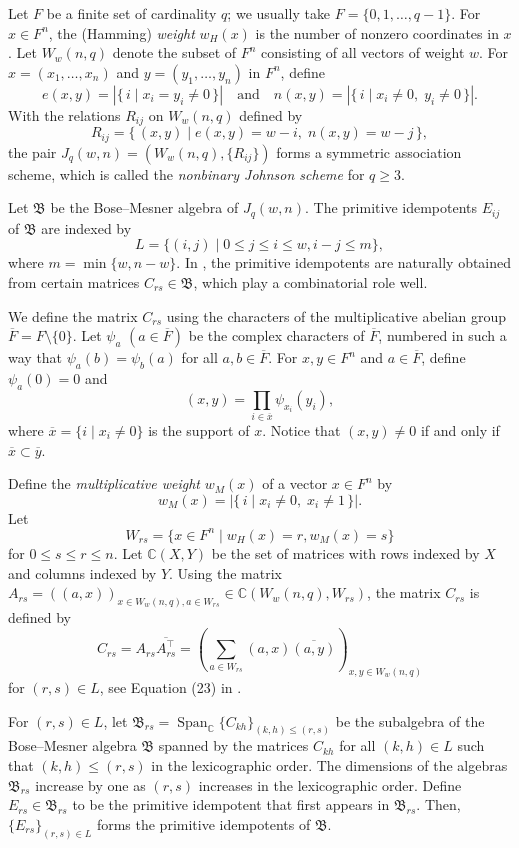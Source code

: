 \documentclass[a4paper, 11pt]{article}
\theoremstyle{definition}
\begin{document}
Let $F$ be a finite set of cardinality $q$; we usually take $F = \{0,1,\ldots,q-1\}$. 
For $x \in F^n$, the (Hamming) \emph{weight} $w_H(x)$ is the number of nonzero coordinates in $x$. 
Let $W_w(n,q)$ denote the subset of $F^n$ consisting of all vectors of weight $w$. 
For $x = (x_1, \ldots, x_n)$ and $y = (y_1, \ldots, y_n)$ in $F^n$, define
\[
e(x,y) = |\{\, i \mid x_i = y_i \ne 0 \,\}| 
\quad \text{and} \quad 
n(x,y) = |\{\, i \mid x_i \ne 0,\; y_i \ne 0 \,\}|.
\]
With the relations $R_{ij}$ on $W_w(n,q)$ defined by
\[
R_{ij} = \{\, (x,y) \mid e(x,y) = w - i,\; n(x,y) = w - j \,\},
\]
the pair $J_q(w,n)=(W_w(n,q), \{R_{ij}\})$ forms a symmetric association scheme, 
which is called the \emph{nonbinary Johnson scheme} for $q\geq 3$. 

Let $\mathfrak{B}$ be the Bose--Mesner algebra of $J_q(w,n)$.  
The primitive idempotents $E_{ij}$ of $\mathfrak{B}$ are indexed by 
\[
L=\{(i,j) \mid 0\leq j \leq i \leq w, i-j\leq m\},
\]
where $m=\min\{w,n-w\}$. 
In \cite{TAG85}, the primitive idempotents are naturally obtained from certain matrices $C_{rs} \in \mathfrak{B}$, which play a combinatorial role well. 

We define the matrix $C_{rs}$ using the characters of the multiplicative abelian group $\overline{F}=F\setminus \{0\}$. 
Let $\psi_a$ $(a \in \overline{F})$ be the complex characters of $\overline{F}$, numbered in such a way that  
$\psi_a(b) = \psi_b(a)$ for all $a,b \in \overline{F}$.  
For $x, y \in F^n$ and $a \in \overline{F}$, define $\psi_a(0) = 0$ and  
\[
(x, y) = \prod_{i \in \overline{x}} \psi_{x_i}(y_i),
\]
where $\overline{x} = \{ i \mid x_i \ne 0 \}$ is the support of $x$.  
Notice that $(x, y) \ne 0$ if and only if $\overline{x} \subset \overline{y}$.  





Define the \emph{multiplicative weight} $w_M(x)$ of a vector $x \in F^n$ by  
\[
w_M(x) = |\{\, i \mid x_i \ne 0,\; x_i \ne 1 \,\}|.
\]
Let 
\[W_{rs}=\{x \in F^n \mid w_H(x)=r,w_M(x)=s\}\] for $0\leq s\leq r \leq n$.
Let $\mathbb{C}(X,Y)$ be the set of matrices with rows indexed by $X$ and columns indexed by $Y$. 
Using the matrix $A_{rs}=((a,x))_{x\in W_w(n,q), a \in W_{rs}} \in \mathbb{C}(W_w(n,q),W_{rs})$, the matrix $C_{rs}$ is defined by
\[
C_{rs}=A_{rs} \overline{A_{rs}^\top}=\left(\sum_{a \in W_{rs}}(a,x)\overline{(a,y)} \right)_{x,y \in W_w(n,q)}
\]
for $(r,s) \in L$, see Equation (23) in \cite{TAG85}. 

For $(r,s)\in L$, let $\mathfrak{B}_{rs}=\operatorname{Span}_{\mathbb{C}} \{C_{kh}\}_{(k,h)\le (r,s)}$ 
be the subalgebra of the Bose--Mesner algebra $\mathfrak{B}$ spanned by the matrices 
$C_{kh}$ for all $(k,h)\in L$ such that $(k,h)\le (r,s)$ in the lexicographic order.  
The dimensions of the algebras $\mathfrak{B}_{rs}$ increase by one as $(r,s)$ 
increases in the lexicographic order.  
Define $E_{rs}\in\mathfrak{B}_{rs}$ to be the primitive idempotent that first appears 
in $\mathfrak{B}_{rs}$. Then, $\{E_{rs}\}_{(r,s) \in L}$ forms the primitive idempotents of $\mathfrak{B}$. 
\end{document}
